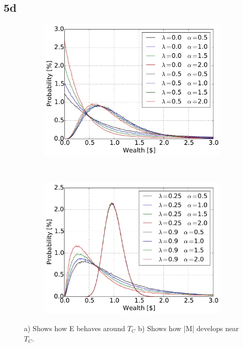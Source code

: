 \pagebreak
\subsection{5d}
\begin{figure}[H]
    \centering
    \begin{subfigure}{0.5\textwidth}
        \centering
        \includegraphics[width=\linewidth]{result/bilder/5d-0050}
        \caption{}
    \end{subfigure}%
    ~ 
    \begin{subfigure}{0.5\textwidth}
        \centering
        \includegraphics[width=\linewidth]{result/bilder/5d-2590}
        \caption{}
    \end{subfigure}
    \caption{a) Shows how E behaves around $T_C$ b) Shows how |M| develops near $T_C$.}
    \label{fig:5d-0050}
\end{figure}



